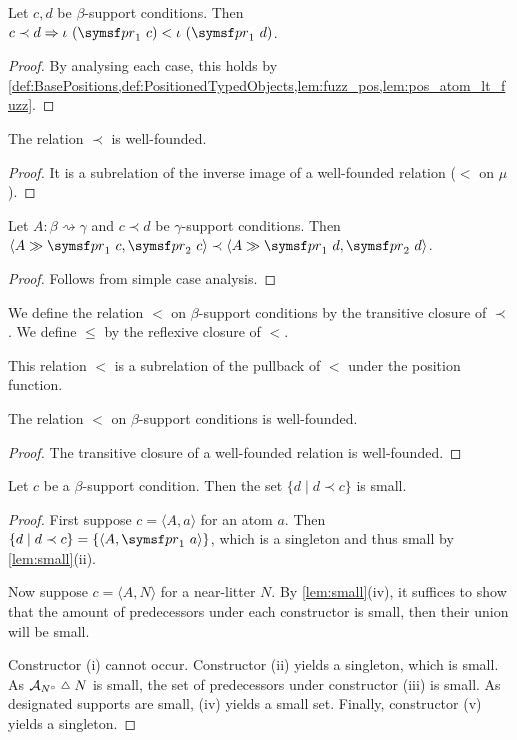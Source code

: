 \begin{lemma}
    Let \( c, d \) be \( \beta \)-support conditions.
    Then \( c \prec d \Rightarrow \iota\ (\pr_1\ c) < \iota\ (\pr_1\ d) \).
\end{lemma}
\begin{proof}
    By analysing each case, this holds by \cref{def:BasePositions,def:PositionedTypedObjects,lem:fuzz_pos,lem:pos_atom_lt_fuzz}.
\end{proof}
\begin{lemma}
    The relation \( \prec \) is well-founded.
\end{lemma}
\begin{proof}
    It is a subrelation of the inverse image of a well-founded relation (\( < \) on \( \mu \)).
\end{proof}
\begin{lemma}
    Let \( A : \beta \rightsquigarrow \gamma \) and \( c \prec d \) be \( \gamma \)-support conditions.
    Then \( \langle A \gg \pr_1\ c, \pr_2\ c \rangle \prec \langle A \gg \pr_1\ d, \pr_2\ d \rangle \).
\end{lemma}
\begin{proof}
    Follows from simple case analysis.
\end{proof}
\begin{definition}
    We define the relation \( < \) on \( \beta \)-support conditions by the transitive closure of \( \prec \).
    We define \( \leq \) by the reflexive closure of \( < \).
\end{definition}
\begin{remark}
    This relation \( < \) is a subrelation of the pullback of \( < \) under the position function.
\end{remark}
\begin{lemma}
    The relation \( < \) on \( \beta \)-support conditions is well-founded.
\end{lemma}
\begin{proof}
    The transitive closure of a well-founded relation is well-founded.
\end{proof}
\begin{lemma}
    \label{lem:small_constrains}
    Let \( c \) be a \( \beta \)-support condition.
    Then the set \( \{d \mid d \prec c\} \) is small.
\end{lemma}
\begin{proof}
    First suppose \( c = \langle A, a \rangle \) for an atom \( a \).
    Then \( \{d \mid d \prec c\} = \{\langle A, \pr_1\ a \rangle\} \), which is a singleton and thus small by \cref{lem:small}(ii).

    Now suppose \( c = \langle A, N \rangle \) for a near-litter \( N \).
    By \cref{lem:small}(iv), it suffices to show that the amount of predecessors under each constructor is small, then their union will be small.

    Constructor (i) cannot occur.
    Constructor (ii) yields a singleton, which is small.
    As \( \mathcal A_{N^\circ} \symmdiff N \) is small, the set of predecessors under constructor (iii) is small.
    As designated supports are small, (iv) yields a small set.
    Finally, constructor (v) yields a singleton.
\end{proof}
